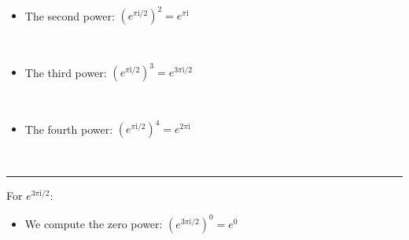 \documentclass[11pt]{article}
\providecommand{\tightlist}{%
      \setlength{\itemsep}{0pt}\setlength{\parskip}{0pt}}
\begin{document}
    \begin{center}
    \end{center}
    { \hspace*{\fill} \\}
    
    \begin{itemize}
\tightlist
\item
  The second power: \((e^{\pi\mathrm{i}/{2}})^2 = e^{\pi\mathrm{i}}\)
\end{itemize}

    \begin{center}
    \end{center}
    { \hspace*{\fill} \\}
    
    \begin{itemize}
\tightlist
\item
  The third power: \((e^{\pi\mathrm{i}/{2}})^3 = e^{3\pi\mathrm{i}/2}\)
\end{itemize}

    \begin{center}
    \end{center}
    { \hspace*{\fill} \\}
    
    \begin{itemize}
\tightlist
\item
  The fourth power: \((e^{\pi\mathrm{i}/{2}})^4 = e^{2\pi\mathrm{i}}\)
\end{itemize}

    \begin{center}
    \end{center}
    { \hspace*{\fill} \\}
    
    \begin{center}\rule{0.5\linewidth}{0.5pt}\end{center}

    For \(e^{3\pi\mathrm{i}/{2}}\):

\begin{itemize}
\tightlist
\item
  We compute the zero power: \((e^{3\pi\mathrm{i}/{2}})^0 = e^0\)
\end{itemize}
\end{document}
